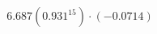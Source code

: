 \documentclass[preview]{standalone}
\begin{document}
\begin{align*}
6.687(0.931^{15}) \cdot (-0.0714)
\end{align*}
\end{document}
